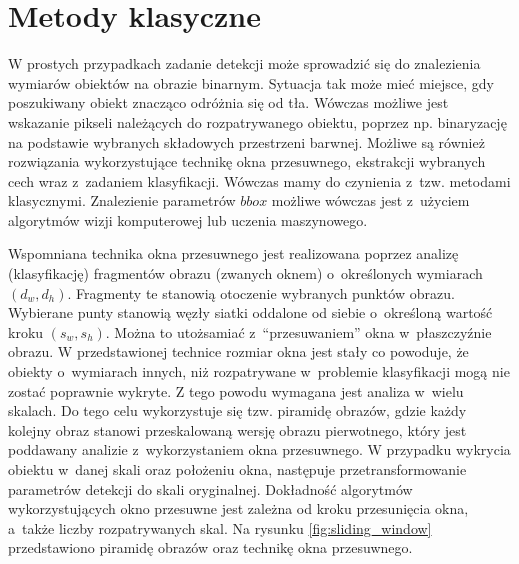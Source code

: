 \section{Metody klasyczne}

W prostych przypadkach zadanie detekcji może sprowadzić się do znalezienia wymiarów obiektów na obrazie binarnym.
Sytuacja tak może mieć miejsce, gdy poszukiwany obiekt znacząco odróżnia się od tła.
Wówczas możliwe jest wskazanie pikseli należących do rozpatrywanego obiektu, poprzez np. binaryzację na podstawie wybranych składowych przestrzeni barwnej.
Możliwe są również rozwiązania wykorzystujące technikę okna przesuwnego, ekstrakcji wybranych cech wraz z~zadaniem klasyfikacji.
Wówczas mamy do czynienia z~tzw. metodami klasycznymi.
Znalezienie parametrów $bbox$ możliwe wówczas jest z~użyciem algorytmów wizji komputerowej lub uczenia maszynowego.

Wspomniana technika okna przesuwnego jest realizowana poprzez analizę (klasyfikację) fragmentów obrazu (zwanych oknem) o~określonych wymiarach $(d_w,d_h)$. 
Fragmenty te stanowią otoczenie wybranych punktów obrazu.
Wybierane punty stanowią węzły siatki oddalone od siebie o~określoną wartość kroku $(s_w,s_h)$. 
Można to utożsamiać z~``przesuwaniem'' okna w~płaszczyźnie obrazu.
W przedstawionej technice rozmiar okna jest stały co powoduje, że obiekty o~wymiarach innych, niż 
rozpatrywane w~problemie klasyfikacji mogą nie zostać poprawnie wykryte.
Z tego powodu wymagana jest analiza w~wielu skalach.
Do tego celu wykorzystuje się tzw. piramidę obrazów, gdzie każdy kolejny obraz stanowi przeskalowaną wersję obrazu pierwotnego, który jest  poddawany analizie z~wykorzystaniem okna przesuwnego.
W przypadku wykrycia obiektu w~danej skali oraz położeniu okna, następuje przetransformowanie parametrów detekcji do skali oryginalnej.
Dokładność algorytmów wykorzystujących okno przesuwne jest zależna od kroku przesunięcia okna, a~także liczby rozpatrywanych skal.
Na rysunku \ref{fig:sliding_window} przedstawiono  piramidę obrazów oraz technikę okna przesuwnego.

